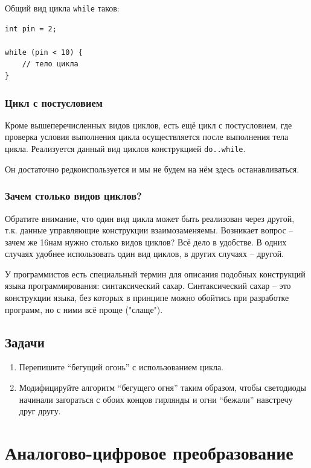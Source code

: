 \documentclass[a4paper,twoside]{book}
\begin{document}
Общий вид цикла \texttt{while} таков:
\begin{verbatim}
int pin = 2;

while (pin < 10) {
    // тело цикла
}
\end{verbatim}

\subsection{Цикл с постусловием}

Кроме вышеперечисленных видов циклов, есть ещё цикл с постусловием, где
проверка условия выполнения цикла осуществляется после выполнения тела цикла.
Реализуется данный вид циклов конструкцией \texttt{do..while}.

Он достаточно редкоиспользуется и мы не будем на нём здесь останавливаться.

\subsection{Зачем столько видов циклов?}

Обратите внимание, что один вид цикла может быть реализован через другой, т.к.
данные управляющие конструкции взаимозаменяемы. Возникает вопрос -- зачем же
16нам нужно столько видов циклов? Всё дело в удобстве. В одних случаях удобнее
использовать один вид циклов, в других случаях -- другой.

У программистов есть специальный термин для описания подобных конструкций языка
программирования: синтаксический сахар. Синтаксический сахар -- это конструкции
языка, без которых в принципе можно обойтись при разработке программ, но с ними
всё проще ("слаще").

\section{Задачи}
\begin{enumerate}
\item Перепишите ``бегущий огонь'' с использованием цикла.
\item Модифицируйте алгоритм ``бегущего огня'' таким образом, чтобы светодиоды
  начинали загораться с обоих концов гирлянды и огни ``бежали'' навстречу друг
  другу.
\end{enumerate}

\chapter{Аналогово-цифровое преобразование}
\end{document}
